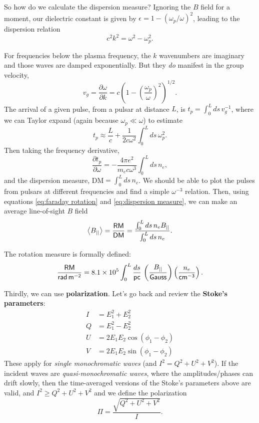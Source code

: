 \documentclass{tufte-handout}
\renewcommand{\textbf}[1]{{\bf \textcolor{dark-gray}{#1}}}
\renewcommand{\rm}{\sf}
\newcommand{\e}[1]{\times 10^{#1}}
\newcommand{\ev}[1]{\left\langle  {#1} \right \rangle} %
\begin{document}
So how do we calculate the dispersion measure? Ignoring the $B$ field for a moment, our dielectric constant is given by $\epsilon = 1 - (\omega_p/\omega)^2$, leading to the dispersion relation
\[c^2k^2 = \omega^2-\omega_p^2.\]

For frequencies below the plasma frequency, the $k$ wavenumbers are imaginary and those waves are damped exponentially. But they \textit{do} manifest in the group velocity, 
\[v_g = \frac{\partial \omega}{\partial k} = c\left (1-\left( \frac{\omega_p}{\omega}\right )^2 \right )^{1/2}.\]
The arrival of a given pulse, from a pulsar at distance $L$, is $t_p = \int_0^L ds\, v_g^{-1}$, where we can Taylor expand (again because $\omega_p \ll \omega$) to estimate 
\[t_p \approx \frac{L}{c} + \frac{1}{2c\omega^2}\int_0^L ds\, \omega_p^2.\]
Then taking the frequency derivative,
\begin{equation} \label{eq:dispersion measure}
\frac{\partial t_p}{\partial \omega} = -\frac{4\pi e^2}{m_e c \omega^3} \int_0^L ds\, n_e,
\end{equation}
and the dispersion measure, DM$ = \int_0^L ds\, n_e$. We should be able to plot the pulses from pulsars at different frequencies and find a simple $\omega^{-3}$ relation. Then, using equations \eqref{eq:faraday rotation} and \eqref{eq:dispersion measure}, we can make an average line-of-sight $B$ field
\begin{equation}
\ev{B_{||}} = \frac{\rm RM}{\rm DM} = \frac{\int_0^L ds\, n_e B_{||}}{\int_0^L ds\, n_e}.
\end{equation}

The rotation measure is formally defined:
\[\frac{\rm RM}{\rm rad\, m^{-2}} = 8.1\e{5} \int_0^L \frac{ds}{\rm pc}\, \left (\frac{B_{||}}{\rm Gauss}\right )\left (\frac{n_e}{\rm cm^{-3}}\right ).\]

Thirdly, we can use \textbf{polarization}. Let's go back and review the \textbf{Stoke's parameters}:
\begin{align}
I &=  E_1^2 + E_2^2\\
Q &=  E_1^2 - E_2^2\\
U &= 2E_1E_2\cos(\phi_1-\phi_2)\\
V &= 2E_1E_2 \sin(\phi_1-\phi_2)
\end{align}
These apply for \textit{single monochromatic waves} (and $I^2 = Q^2 + U^2 + V^2$). If the incident waves are \textit{quasi-monochromatic waves}, where the amplitudes/phases can drift slowly, then the time-averaged versions of the Stoke's parameters above are valid, and $I^2 \geq Q^2 + U^2 + V^2$ and we define the polarization
\begin{equation}
\Pi = \frac{\sqrt{Q^2 + U^2 + V^2}}{I}.
\end{equation}
\end{document}
